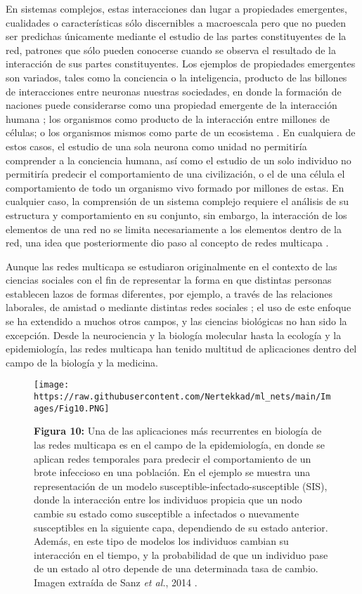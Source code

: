 \documentclass[
]{book}
\begin{document}
En sistemas complejos, estas interacciones dan lugar a propiedades emergentes, cualidades o características sólo discernibles a macroescala pero que no pueden ser predichas únicamente mediante el estudio de las partes constituyentes de la red, patrones que sólo pueden conocerse cuando se observa el resultado de la interacción de sus partes constituyentes. Los ejemplos de propiedades emergentes son variados, tales como la conciencia o la inteligencia, producto de las billones de interacciones entre neuronas \citep{o1994emergent} nuestras sociedades, en donde la formación de naciones puede considerarse como una propiedad emergente de la interacción humana \citep{lazega1999multiplexity}; los organismos como producto de la interacción entre millones de células; o los organismos mismos como parte de un ecosistema \citep{liu2016control}. En cualquiera de estos casos, el estudio de una sola neurona como unidad no permitiría comprender a la conciencia humana, así como el estudio de un solo individuo no permitiría predecir el comportamiento de una civilización, o el de una célula el comportamiento de todo un organismo vivo formado por millones de estas. En cualquier caso, la comprensión de un sistema complejo requiere el análisis de su estructura y comportamiento en su conjunto, sin embargo, la interacción de los elementos de una red no se limita necesariamente a los elementos dentro de la red, una idea que posteriormente dio paso al concepto de redes multicapa \citep{bianconi2018multilayer}.

Aunque las redes multicapa se estudiaron originalmente en el contexto de las ciencias sociales con el fin de representar la forma en que distintas personas establecen lazos de formas diferentes, por ejemplo, a través de las relaciones laborales, de amistad o mediante distintas redes sociales \citep{lazega1999multiplexity}; el uso de este enfoque se ha extendido a muchos otros campos, y las ciencias biológicas no han sido la excepción. Desde la neurociencia y la biología molecular hasta la ecología y la epidemiología, las redes multicapa han tenido multitud de aplicaciones dentro del campo de la biología y la medicina.

\begin{figure}
\centering
\texttt{[image: https://raw.githubusercontent.com/Nertekkad/ml\_nets/main/Images/Fig10.PNG]}
\caption{\textbf{Figura 10:} Una de las aplicaciones más recurrentes en biología de las redes multicapa es en el campo de la epidemiología, en donde se aplican redes temporales para predecir el comportamiento de un brote infeccioso en una población. En el ejemplo se muestra una representación de un modelo susceptible-infectado-susceptible (SIS), donde la interacción entre los individuos propicia que un nodo cambie su estado como susceptible a infectados o nuevamente susceptibles en la siguiente capa, dependiendo de su estado anterior. Además, en este tipo de modelos los individuos cambian su interacción en el tiempo, y la probabilidad de que un individuo pase de un estado al otro depende de una determinada tasa de cambio. Imagen extraída de Sanz \emph{et al.}, 2014 \citep{sanz2014dynamics}.}
\end{figure}
\end{document}
